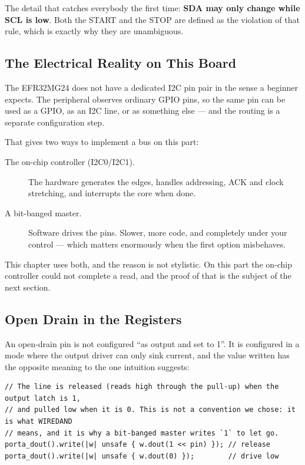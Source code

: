 The detail that catches everybody the first time: \textbf{SDA may only change while SCL is
low}. Both the START and the STOP are defined as the violation of that rule, which is
exactly why they are unambiguous.

\subsection{The Electrical Reality on This Board}

The EFR32MG24 does not have a dedicated I2C pin pair in the sense a beginner expects. The
peripheral observes ordinary GPIO pins, so the same pin can be used as a GPIO, as an I2C
line, or as something else — and the routing is a separate configuration step.

That gives two ways to implement a bus on this part:

\begin{description}
    \item[The on-chip controller (I2C0/I2C1).] The hardware generates the edges, handles
          addressing, ACK and clock stretching, and interrupts the core when done.
    \item[A bit-banged master.] Software drives the pins. Slower, more code, and completely
          under your control — which matters enormously when the first option misbehaves.
\end{description}

This chapter uses both, and the reason is not stylistic. On this part the on-chip
controller could not complete a read, and the proof of that is the subject of the next
section.

\subsection{Open Drain in the Registers}

An open-drain pin is not configured ``as output and set to 1''. It is configured in a mode
where the output driver can only sink current, and the value written has the opposite
meaning to the one intuition suggests:

\begin{verbatim}
// The line is released (reads high through the pull-up) when the output latch is 1,
// and pulled low when it is 0. This is not a convention we chose: it is what WIREDAND
// means, and it is why a bit-banged master writes `1` to let go.
porta_dout().write(|w| unsafe { w.dout(1 << pin) }); // release
porta_dout().write(|w| unsafe { w.dout(0) });        // drive low
\end{verbatim}

